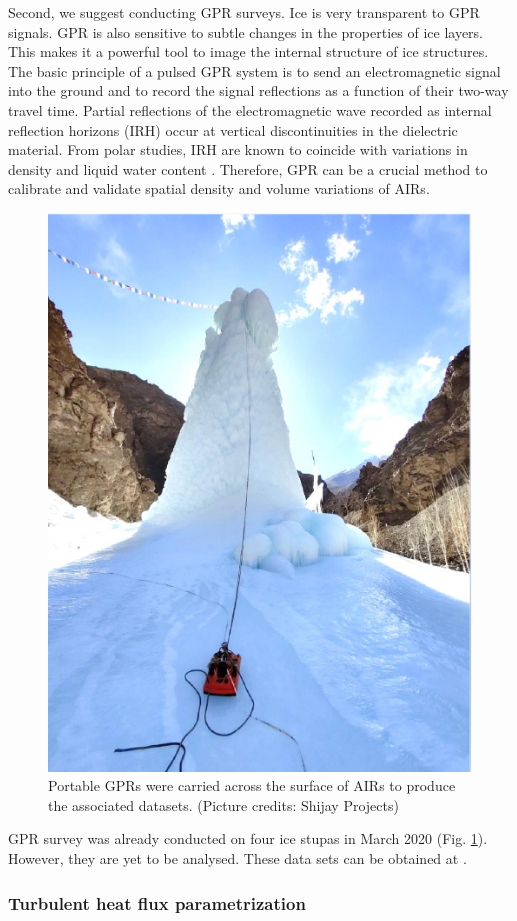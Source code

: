 Second, we suggest conducting \ac{GPR} surveys. Ice is very transparent to \ac{GPR} signals. \ac{GPR} is also
sensitive to subtle changes in the properties of ice layers. This makes it a powerful tool to image the internal
structure of ice structures. The basic principle of a pulsed \ac{GPR} system is to send an electromagnetic
signal into the ground and to record the signal reflections as a function of their two-way travel time. Partial
reflections of the electromagnetic wave recorded as internal reflection horizons (IRH) occur at vertical
discontinuities in the dielectric material. From polar studies, IRH are known to coincide with variations in
density and liquid water content \citep{forster2014extensive}. Therefore, \ac{GPR} can be a crucial method to
calibrate and validate spatial density and volume variations of \ac{AIRs}.


\begin{figure}[htb]
  \centering
	\includegraphics[width=8 cm]{figs/gpr_survey}
  \caption{Portable \ac{GPR}s were carried across the surface of \ac{AIRs} to produce the associated datasets. (Picture credits:
  Shijay Projects)}
	\label{fig:gpr_survey}
\end{figure}

\ac{GPR} survey was already conducted on four ice stupas in March 2020 (Fig. \ref{fig:gpr_survey}). However,
they are yet to be analysed. These data sets can be obtained at
\citet{balasubramanian_suryanarayanan_2022_7056646}.

\subsubsection{Turbulent heat flux parametrization}

